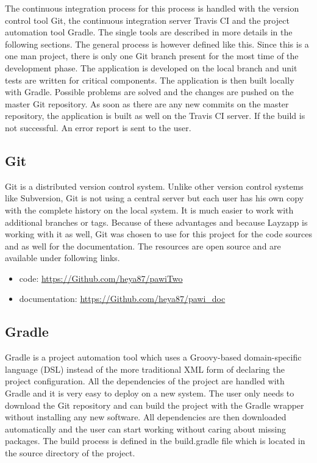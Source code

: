 The continuous integration process for this process is handled with the version control tool Git, the continuous integration server Travis CI and the project automation tool Gradle. The single tools are described in more details in the following sections. The general process is however defined like this. Since this is a one man project, there is only one Git branch present for the most time of the development phase. The application is developed on the local branch and unit tests are written for critical components. The application is then built locally with Gradle. Possible problems are solved and the changes are pushed on the master Git repository. As soon as there are any new commits on the master repository, the application is built as well on the Travis CI server. If the build is not successful. An error report is sent to the user.

\subsection{Git}

Git is a distributed version control system. Unlike other version control systems like Subversion, Git is not using a central server but each user has his own copy with the complete history on the local system. It is much easier to work with additional branches or tags. 
Because of these advantages and because Layzapp is working with it as well, Git was chosen to use for this project for the code sources and as well for the documentation.
The resources are open source and are available under following links.

\begin{itemize}
\item code: \url{https://Github.com/heya87/pawiTwo}
\item documentation: \url{https://Github.com/heya87/pawi_doc}
\end{itemize}


\subsection{Gradle}

Gradle is a project automation tool which uses a Groovy-based domain-specific language (DSL) instead of the more traditional XML form of declaring the project configuration. All the dependencies of the project are handled with Gradle and it is very easy to deploy on a new system. The user only needs to download the Git repository and can build the project with the Gradle wrapper without installing any new software. All dependencies are then downloaded automatically and the user can start working without caring about missing packages.
The build process is defined in the build.gradle file which is located in the source directory of the project. 

